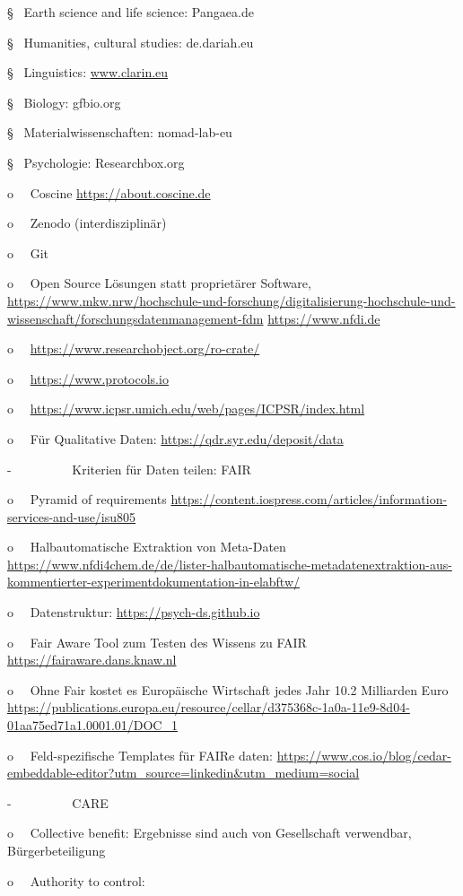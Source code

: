 \documentclass[
  letterpaper,
  DIV=11,
  numbers=noendperiod]{scrreprt}
\begin{document}
§~ Earth science and life science: Pangaea.de

§~ Humanities, cultural studies: de.dariah.eu

§~ Linguistics: \href{http://www.clarin.eu}{www.clarin.eu}

§~ Biology: gfbio.org

§~ Materialwissenschaften: nomad-lab-eu

§~ Psychologie: Researchbox.org

o~~ Coscine \url{https://about.coscine.de}

o~~ Zenodo (interdisziplinär)

o~~ Git

o~~ Open Source Lösungen statt proprietärer Software,
\url{https://www.mkw.nrw/hochschule-und-forschung/digitalisierung-hochschule-und-wissenschaft/forschungsdatenmanagement-fdm}
\url{https://www.nfdi.de}

o~~ \url{https://www.researchobject.org/ro-crate/}

o~~ \url{https://www.protocols.io}

o~~ \url{https://www.icpsr.umich.edu/web/pages/ICPSR/index.html}

o~~ Für Qualitative Daten: \url{https://qdr.syr.edu/deposit/data}

-~~~~~~~~~ Kriterien für Daten teilen: FAIR

o~~ Pyramid of requirements
\url{https://content.iospress.com/articles/information-services-and-use/isu805}

o~~ Halbautomatische Extraktion von Meta-Daten
\url{https://www.nfdi4chem.de/de/lister-halbautomatische-metadatenextraktion-aus-kommentierter-experimentdokumentation-in-elabftw/}

o~~ Datenstruktur: \url{https://psych-ds.github.io}

o~~ Fair Aware Tool zum Testen des Wissens zu FAIR
\url{https://fairaware.dans.knaw.nl}

o~~ Ohne Fair kostet es Europäische Wirtschaft jedes Jahr 10.2
Milliarden Euro
\url{https://publications.europa.eu/resource/cellar/d375368c-1a0a-11e9-8d04-01aa75ed71a1.0001.01/DOC_1}

o~~ Feld-spezifische Templates für FAIRe daten:
\url{https://www.cos.io/blog/cedar-embeddable-editor?utm_source=linkedin&utm_medium=social}

-~~~~~~~~~ CARE

o~~ Collective benefit: Ergebnisse sind auch von Gesellschaft
verwendbar, Bürgerbeteiligung

o~~ Authority to control:
\end{document}

